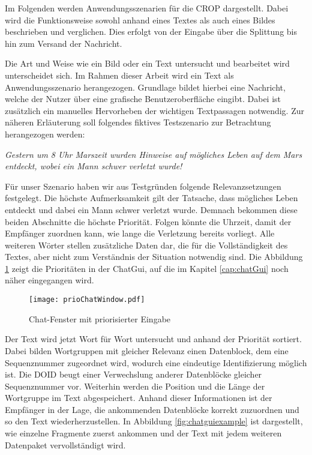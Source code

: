 \label{sec:Anwendungsszenarien}

Im Folgenden werden Anwendungsszenarien für die \gls{CROP} dargestellt. Dabei
wird die Funktionsweise sowohl anhand eines Textes als auch eines Bildes beschrieben und
verglichen. Dies erfolgt von der Eingabe über die Splittung bis hin zum Versand
der Nachricht.

Die Art und Weise wie ein Bild oder ein Text untersucht und bearbeitet wird
unterscheidet sich. Im Rahmen dieser Arbeit wird ein Text als
Anwendungsszenario herangezogen. Grundlage bildet hierbei eine Nachricht,
welche der Nutzer über eine grafische Benutzeroberfläche eingibt.
Dabei ist zusätzlich ein manuelles Hervorheben der wichtigen Textpassagen
notwendig. Zur näheren Erläuterung soll folgendes fiktives Testszenario zur
Betrachtung herangezogen werden:

\textit{\glqq Gestern um 8 Uhr Marszeit wurden Hinweise auf mögliches Leben auf
dem Mars entdeckt, wobei ein Mann schwer verletzt wurde! \grqq}

Für unser Szenario haben wir aus Testgründen folgende Relevanzsetzungen
festgelegt. Die höchste Aufmerksamkeit gilt der Tatsache, dass mögliches Leben
entdeckt und dabei ein Mann schwer verletzt wurde. Demnach bekommen diese beiden
Abschnitte die höchste Priorität. Folgen könnte die Uhrzeit, damit der Empfänger
zuordnen kann, wie lange die Verletzung bereits vorliegt. Alle weiteren Wörter
stellen zusätzliche Daten dar, die für die Vollständigkeit des Textes, aber
nicht zum Verständnis der Situation notwendig sind. Die Abbildung
\ref{fig:prioChatWindow} zeigt die Prioritäten in der ChatGui, auf die im
Kapitel \ref{cap:chatGui} noch näher eingegangen wird.

\begin{figure}[H]
	\centering
	\texttt{[image: prioChatWindow.pdf]}
	\caption{Chat-Fenster mit priorisierter Eingabe}
	\label{fig:prioChatWindow}
\end{figure}

Der Text wird jetzt Wort für Wort untersucht und anhand der Priorität sortiert.
Dabei bilden Wortgruppen mit gleicher Relevanz einen Datenblock, dem eine
Sequenznummer zugeordnet wird, wodurch eine eindeutige Identifizierung möglich
ist. Die \gls{DOID} beugt einer Verwechslung anderer Datenblöcke gleicher
Sequenznummer vor. Weiterhin werden die Position und die Länge der Wortgruppe im
Text abgespeichert. Anhand dieser Informationen ist der Empfänger in der Lage,
die ankommenden Datenblöcke korrekt zuzuordnen und so den Text
wiederherzustellen.
In Abbildung \ref{fig:chatguiexample} ist dargestellt, wie einzelne Fragmente
zuerst ankommen und der Text mit jedem weiteren Datenpaket vervollständigt wird.

